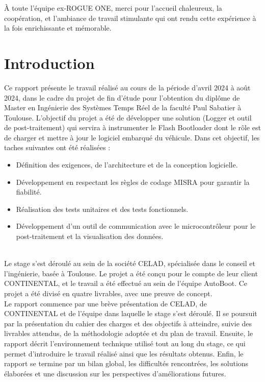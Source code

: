 \documentclass[a4paper, 12pt]{report}
\begin{document}
À toute l'équipe ex-ROGUE ONE, merci pour l'accueil chaleureux, la coopération, et l'ambiance de travail stimulante qui ont rendu cette expérience à la fois enrichissante et mémorable.
\thispagestyle{empty}

\tableofcontents

\printacronyms

\printglossaries
\chapter{\textbf{Introduction}}
\setcounter{page}{1}

Ce rapport présente le travail réalisé au cours de la période d’avril 2024 à août 2024, dans le cadre du projet de fin d’étude pour l’obtention du diplôme de Master en Ingénierie des Systèmes Temps Réel de la faculté Paul Sabatier à Toulouse. L’objectif du projet a été de développer une solution (Logger et outil de post-traitement) qui servira à instrumenter le Flash Bootloader dont le rôle est de charger et mettre à jour le logiciel embarqué du véhicule. Dans cet objectif, les taches suivantes ont été réalisées : \\

\begin{itemize}
    \item Définition des exigences, de l'architecture et de la conception logicielle.
 \item Développement en respectant les règles de codage MISRA pour garantir la fiabilité.
 \item Réalisation des tests unitaires et des tests fonctionnels.
 \item Développement d’un outil de communication avec le microcontrôleur pour le post-traitement et la visualisation des données. \\
\end{itemize}
\\


Le stage s’est déroulé au sein de la société CELAD, spécialisée dans le conseil et l’ingénierie, basée à Toulouse. Le projet a été conçu pour le compte de leur client CONTINENTAL, et le travail a été effectué au sein de l’équipe AutoBoot. Ce projet a été divisé en quatre livrables, avec une preuve de concept.\\

Le rapport commence par une brève présentation de CELAD, de CONTINENTAL et de l’équipe dans laquelle le stage s’est déroulé. Il se poursuit par la présentation du cahier des charges et des objectifs à atteindre, suivie des livrables attendus, de la méthodologie adoptée et du plan de travail. Ensuite, le rapport décrit l’environnement technique utilisé tout au long du stage, ce qui permet d’introduire le travail réalisé ainsi que les résultats obtenus. Enfin, le rapport se termine par un bilan global, les difficultés rencontrées, les solutions élaborées et une discussion sur les perspectives d’améliorations futures.
\end{document}
